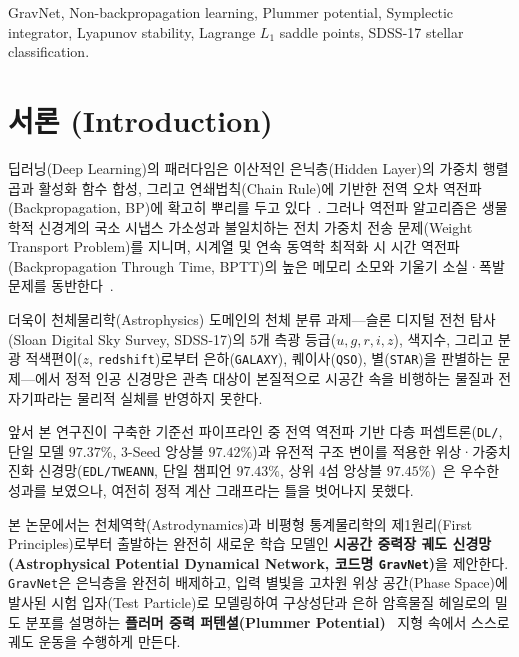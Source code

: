 \documentclass[journal]{IEEEtran}
\begin{document}
\begin{IEEEkeywords}
GravNet, Non-backpropagation learning, Plummer potential, Symplectic integrator, Lyapunov stability, Lagrange $L_1$ saddle points, SDSS-17 stellar classification.
\end{IEEEkeywords}

\section{서론 (Introduction)}
 딥러닝(Deep Learning)의 패러다임은 이산적인 은닉층(Hidden Layer)의 가중치 행렬곱과 활성화 함수 합성, 그리고 연쇄법칙(Chain Rule)에 기반한 전역 오차 역전파(Backpropagation, BP)에 확고히 뿌리를 두고 있다~\cite{yosinski2014}. 그러나 역전파 알고리즘은 생물학적 신경계의 국소 시냅스 가소성과 불일치하는 전치 가중치 전송 문제(Weight Transport Problem)를 지니며, 시계열 및 연속 동역학 최적화 시 시간 역전파(Backpropagation Through Time, BPTT)의 높은 메모리 소모와 기울기 소실·폭발 문제를 동반한다~\cite{hinton2022,scellier2017}.

더욱이 천체물리학(Astrophysics) 도메인의 천체 분류 과제---슬론 디지털 전천 탐사(Sloan Digital Sky Survey, SDSS-17)의 5개 측광 등급($u, g, r, i, z$), 색지수, 그리고 분광 적색편이($z$, \texttt{redshift})로부터 은하(\texttt{GALAXY}), 퀘이사(\texttt{QSO}), 별(\texttt{STAR})을 판별하는 문제---에서 정적 인공 신경망은 관측 대상이 본질적으로 시공간 속을 비행하는 물질과 전자기파라는 물리적 실체를 반영하지 못한다.

앞서 본 연구진이 구축한 기준선 파이프라인 중 전역 역전파 기반 다층 퍼셉트론(\texttt{DL/}, 단일 모델 $97.37\%$, 3-Seed 앙상블 $97.42\%$)과 유전적 구조 변이를 적용한 위상·가중치 진화 신경망(\texttt{EDL/TWEANN}, 단일 챔피언 $97.43\%$, 상위 4섬 앙상블 $97.45\%$)~\cite{stanley2002}은 우수한 성과를 보였으나, 여전히 정적 계산 그래프라는 틀을 벗어나지 못했다.

본 논문에서는 천체역학(Astrodynamics)과 비평형 통계물리학의 제1원리(First Principles)로부터 출발하는 완전히 새로운 학습 모델인 \textbf{시공간 중력장 궤도 신경망(Astrophysical Potential Dynamical Network, 코드명 \texttt{GravNet})}을 제안한다. \texttt{GravNet}은 은닉층을 완전히 배제하고, 입력 별빛을 고차원 위상 공간(Phase Space)에 발사된 시험 입자(Test Particle)로 모델링하여 구상성단과 은하 암흑물질 헤일로의 밀도 분포를 설명하는 \textbf{플러머 중력 퍼텐셜(Plummer Potential)}~\cite{plummer1911} 지형 속에서 스스로 궤도 운동을 수행하게 만든다.
\end{document}
